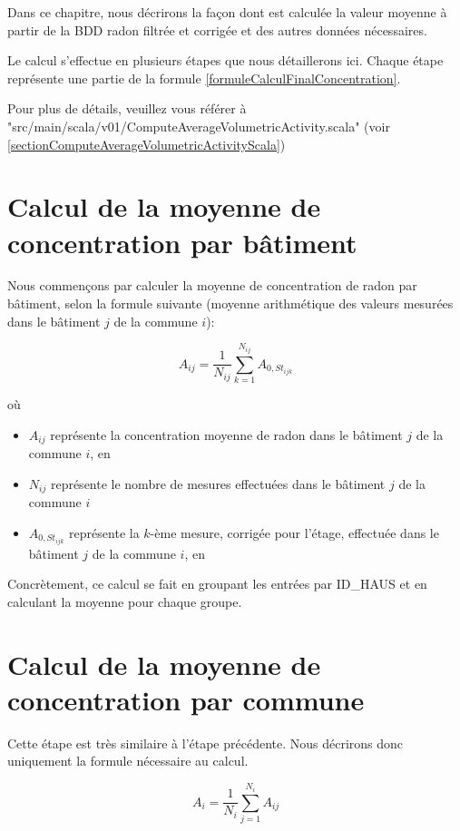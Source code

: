 Dans ce chapitre, nous décrirons la façon dont est calculée la valeur moyenne à partir de la BDD radon filtrée et corrigée et des autres données nécessaires.

Le calcul s'effectue en plusieurs étapes que nous détaillerons ici.
Chaque étape représente une partie de la formule \ref{formuleCalculFinalConcentration}.

Pour plus de détails, veuillez vous référer à "src/main/scala/v01/ComputeAverageVolumetricActivity.scala" (voir \ref{sectionComputeAverageVolumetricActivityScala})

\section{Calcul de la moyenne de concentration par bâtiment}
Nous commençons par calculer la moyenne de concentration de radon par bâtiment, selon la formule suivante (moyenne arithmétique des valeurs mesurées dans le bâtiment $j$ de la commune $i$):

\begin{equation}
A_{ij} = \frac{1}{N_{ij}} \sum_{k=1}^{N_{ij}} A_{0, St_{ijk}}
\end{equation}

où
\begin{itemize}
\item $A_{ij}$ représente la concentration moyenne de radon dans le bâtiment $j$ de la commune $i$, en \bqmc
\item $N_{ij}$ représente le nombre de mesures effectuées dans le bâtiment $j$ de la commune $i$
\item $A_{0, St_{ijk}}$ représente la $k$-ème mesure, corrigée pour l'étage, effectuée dans le bâtiment $j$ de la commune $i$, en \bqmc
\end{itemize}

Concrètement, ce calcul se fait en groupant les entrées par ID\_HAUS et en calculant la moyenne pour chaque groupe.

\section{Calcul de la moyenne de concentration par commune}
Cette étape est très similaire à l'étape précédente. Nous décrirons donc uniquement la formule nécessaire au calcul.

\begin{equation}
A_i = \frac{1}{N_i} \sum_{j=1}^{N_i} A_{ij} 
\end{equation}


